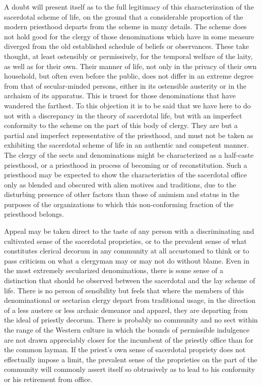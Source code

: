 \documentclass[12pt]{report}
\begin{document}
A doubt will present itself as to the full legitimacy of this
characterization of the sacerdotal scheme of life, on the ground that a
considerable proportion of the modern priesthood departs from the scheme
in many details. The scheme does not hold good for the clergy of
those denominations which have in some measure diverged from the old
established schedule of beliefs or observances. These take thought, at
least ostensibly or permissively, for the temporal welfare of the laity,
as well as for their own. Their manner of life, not only in the privacy
of their own household, but often even before the public, does not
differ in an extreme degree from that of secular-minded persons, either
in its ostensible austerity or in the archaism of its apparatus. This is
truest for those denominations that have wandered the farthest. To
this objection it is to be said that we have here to do not with a
discrepancy in the theory of sacerdotal life, but with an imperfect
conformity to the scheme on the part of this body of clergy. They are
but a partial and imperfect representative of the priesthood, and must
not be taken as exhibiting the sacerdotal scheme of life in an authentic
and competent manner. The clergy of the sects and denominations might be
characterized as a half-caste priesthood, or a priesthood in process of
becoming or of reconstitution. Such a priesthood may be expected to
show the characteristics of the sacerdotal office only as blended
and obscured with alien motives and traditions, due to the disturbing
presence of other factors than those of animism and status in the
purposes of the organizations to which this non-conforming fraction of
the priesthood belongs.

Appeal may be taken direct to the taste of any person with a
discriminating and cultivated sense of the sacerdotal proprieties, or
to the prevalent sense of what constitutes clerical decorum in any
community at all accustomed to think or to pass criticism on what a
clergyman may or may not do without blame. Even in the most extremely
secularized denominations, there is some sense of a distinction that
should be observed between the sacerdotal and the lay scheme of life.
There is no person of sensibility but feels that where the members of
this denominational or sectarian clergy depart from traditional usage,
in the direction of a less austere or less archaic demeanor and apparel,
they are departing from the ideal of priestly decorum. There is probably
no community and no sect within the range of the Western culture in
which the bounds of permissible indulgence are not drawn appreciably
closer for the incumbent of the priestly office than for the common
layman. If the priest's own sense of sacerdotal propriety does not
effectually impose a limit, the prevalent sense of the proprieties on
the part of the community will commonly assert itself so obtrusively as
to lead to his conformity or his retirement from office.
\end{document}
